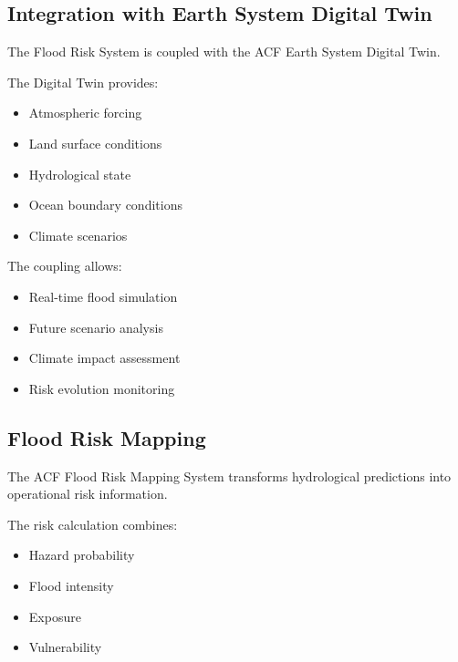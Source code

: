 \subsection{Integration with Earth System Digital Twin}

The Flood Risk System is coupled with the ACF Earth System Digital Twin.

The Digital Twin provides:

\begin{itemize}

\item Atmospheric forcing

\item Land surface conditions

\item Hydrological state

\item Ocean boundary conditions

\item Climate scenarios

\end{itemize}


The coupling allows:

\begin{itemize}

\item Real-time flood simulation

\item Future scenario analysis

\item Climate impact assessment

\item Risk evolution monitoring

\end{itemize}


\subsection{Flood Risk Mapping}

The ACF Flood Risk Mapping System transforms hydrological predictions
into operational risk information.

The risk calculation combines:

\begin{itemize}

\item Hazard probability

\item Flood intensity

\item Exposure

\item Vulnerability

\end{itemize}


